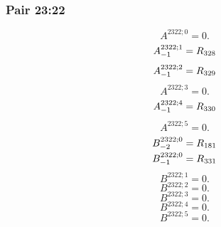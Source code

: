 \documentclass[11pt,a4paper]{article}
\begin{document}
\subsubsection{Pair 23:22}
\begin{equation}
A^{2322;0}=0.
\label{eq:cat-map-474}
\end{equation}
\begin{equation}
\shortstack[l]{$\displaystyle A^{2322;1}_{-1}=R_{328}$}
\label{eq:cat-map-475}
\end{equation}
\begin{equation}
\shortstack[l]{$\displaystyle A^{2322;2}_{-1}=R_{329}$}
\label{eq:cat-map-476}
\end{equation}
\begin{equation}
A^{2322;3}=0.
\label{eq:cat-map-477}
\end{equation}
\begin{equation}
\shortstack[l]{$\displaystyle A^{2322;4}_{-1}=R_{330}$}
\label{eq:cat-map-478}
\end{equation}
\begin{equation}
A^{2322;5}=0.
\label{eq:cat-map-479}
\end{equation}
\begin{equation}
\shortstack[l]{$\displaystyle B^{2322;0}_{-2}=R_{181}$\\
$\displaystyle B^{2322;0}_{-1}=R_{331}$}
\label{eq:cat-map-480}
\end{equation}
\begin{equation}
B^{2322;1}=0.
\label{eq:cat-map-481}
\end{equation}
\begin{equation}
B^{2322;2}=0.
\label{eq:cat-map-482}
\end{equation}
\begin{equation}
B^{2322;3}=0.
\label{eq:cat-map-483}
\end{equation}
\begin{equation}
B^{2322;4}=0.
\label{eq:cat-map-484}
\end{equation}
\begin{equation}
B^{2322;5}=0.
\label{eq:cat-map-485}
\end{equation}
\end{document}
